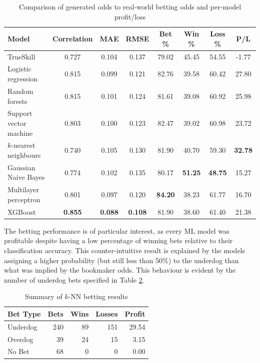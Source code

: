 \begin{table}[h!]
	\centering
	\small
	\begin{adjustbox}{center} %
		\begin{tabular}{ |l|c|c|c|c|c|c|c| }
			\hline
			\rule{0pt}{2.6ex} \textbf{Model} & \textbf{Correlation} & \textbf{MAE} & \textbf{RMSE} & \textbf{Bet \%} & \textbf{Win \%} & \textbf{Loss \%} & \textbf{P/L} \\
			\hline
			\rule{0pt}{2.6ex} TrueSkill                 & 0.727 & 0.104 & 0.137 & 79.02 & 45.45 & 54.55 & -1.77 \\ \hline
			\rule{0pt}{2.6ex} Logistic regression       & 0.815 & 0.099  & 0.121 & 82.76 & 39.58 & 60.42 & 27.80 \\
			\rule{0pt}{2.6ex} Random forests            & 0.815 & 0.101 & 0.124 & 81.61 & 39.08 & 60.92 & 25.98 \\
			\rule{0pt}{2.6ex} Support vector machine    & 0.803 & 0.100 & 0.123 & 82.47 & 39.02 & 60.98 & 23.72 \\
			\rule{0pt}{2.6ex} $k$-nearest neighbours 	& 0.740 & 0.105 & 0.130 & 81.90 & 40.70 & 59.30 & \textbf{32.78} \\
			\rule{0pt}{2.6ex} Gaussian Naive Bayes      & 0.774 & 0.102 & 0.135 & 80.17 & \textbf{51.25} &\textbf{ 48.75} & 15.27 \\
			\rule{0pt}{2.6ex} Multilayer perceptron     & 0.801 & 0.097  & 0.120 & \textbf{84.20} & 38.23 & 61.77 & 16.70 \\
			\rule{0pt}{2.6ex} XGBoost                   & \textbf{0.855} &  \textbf{0.088} & \textbf{0.108} & 81.90 & 38.60 & 61.40 & 21.38 \\
			\hline
		\end{tabular}
	\end{adjustbox}
	\caption{Comparison of generated odds to real-world betting odds and per-model profit/loss}
	\label{table:bettingperformance}
\end{table}

The betting performance is of particular interest, as every ML model was profitable despite having a low percentage of winning bets relative to their classification accuracy. This counter-intuitive result is explained by the models assigning a higher probability (but still less than 50\%) to the underdog than what was implied by the bookmaker odds. This behaviour is evident by the number of underdog bets specified in Table \ref{tab:betting_results}.

\begin{table}[h]
	\centering
	\begin{tabular}{lrrrr}
		\toprule
		Bet Type & Bets & Wins & Losses & Profit \\
		\midrule
		Underdog & 240 & 89 & 151 & 29.54 \\
		Overdog & 39 & 24 & 15 & 3.15 \\
		No Bet & 68 & 0 & 0 & 0.00 \\
		\bottomrule
	\end{tabular}
	\caption{Summary of $k$-NN betting results}
	\label{tab:betting_results}
\end{table}

